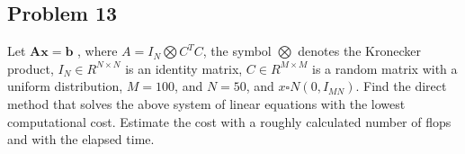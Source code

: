 \subsection{Problem 13}

Let $\mathbf{Ax = b}$ , where $A = I_N \bigotimes C^TC$, the symbol $\bigotimes$ denotes the Kronecker product, $I_N \in R^{N \times N}$ is an identity matrix, $C \in R^{M \times M}$ is a random matrix with a uniform distribution, $M = 100$, and $N=50$, and $x \square N(0, I_{MN})$. Find the direct method that solves the above system  of  linear  equations  with  the  lowest  computational  cost.  Estimate  the  cost  with  a  roughly calculated number of flops and with the elapsed time.